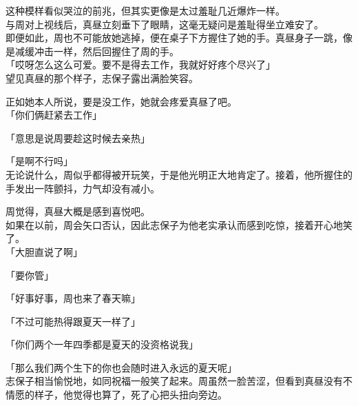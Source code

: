 这种模样看似哭泣的前兆，但其实更像是太过羞耻几近爆炸一样。\\

与周对上视线后，真昼立刻垂下了眼睛，这毫无疑问是羞耻得坐立难安了。\\

即便如此，周也不可能放她逃掉，便在桌子下方握住了她的手。真昼身子一跳，像是减缓冲击一样，然后回握住了周的手。\\

「哎呀怎么这么可爱。要不是得去工作，我就好好疼个尽兴了」\\

望见真昼的那个样子，志保子露出满脸笑容。

正如她本人所说，要是没工作，她就会疼爱真昼了吧。\\

「你们俩赶紧去工作」

「意思是说周要趁这时候去亲热」

「是啊不行吗」\\

无论说什么，周似乎都得被开玩笑，于是他光明正大地肯定了。接着，他所握住的手发出一阵颤抖，力气却没有减小。

周觉得，真昼大概是感到喜悦吧。\\

如果在以前，周会矢口否认，因此志保子为他老实承认而感到吃惊，接着开心地笑了。\\

「大胆直说了啊」

「要你管」

「好事好事，周也来了春天嘛」

「不过可能热得跟夏天一样了」

「你们两个一年四季都是夏天的没资格说我」

「那么我们两个生下的你也会随时进入永远的夏天呢」\\

志保子相当愉悦地，如同祝福一般笑了起来。周虽然一脸苦涩，但看到真昼没有不情愿的样子，他觉得也算了，死了心把头扭向旁边。
